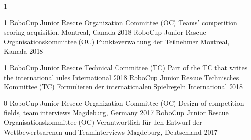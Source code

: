 \multilang
  {1}
  {}
  {}

\begin{cvhonors}
\multilang
  {1}
  {\cvhonor
    {RoboCup Junior Rescue Organization Committee (OC)} %
    {Teams' competition scoring acquisition} %
    {Montreal, Canada} %
    {2018} %
  }{\cvhonor
    {RoboCup Junior Rescue Organisationskommittee (OC)}
    {Punkteverwaltung der Teilnehmer}
    {Montreal, Kanada}
    {2018}
  }

\multilang
  {1}
  {\cvhonor
    {RoboCup Junior Rescue Technical Committee (TC)} %
    {Part of the TC that writes the international rules} %
    {International} %
    {2018} %
  }{\cvhonor
    {RoboCup Junior Rescue Technisches Kommittee (TC)}
    {Formulieren der internationalen Spielregeln}
    {International}
    {2018}
  }

\multilang
  {0}
  {\cvhonor
    {RoboCup Junior Rescue Organization Committee (OC)} %
    {Design of competition fields, team interviews} %
    {Magdeburg, Germany} %
    {2017} %
  }{\cvhonor
    {RoboCup Junior Rescue Organisationskommittee (OC)}
    {Verantwortlich für den Entwurf der Wettbewerbsarenen und Teaminterviews}
    {Magdeburg, Deutschland}
    {2017}
  }
\end{cvhonors}
